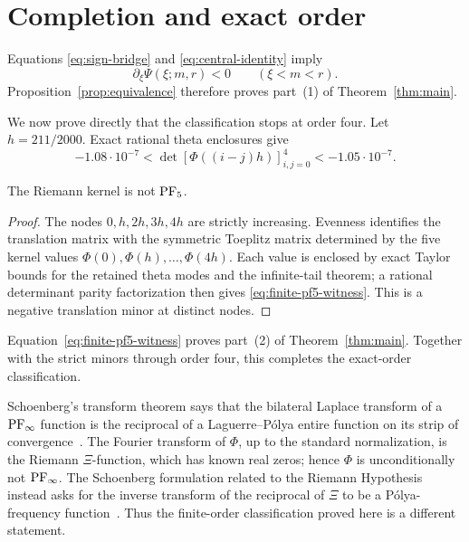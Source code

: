 \section{Completion and exact order}\label{sec:completion}

Equations \eqref{eq:sign-bridge} and \eqref{eq:central-identity} imply
\[
 \partial_\xi\Psi(\xi;m,r)<0\qquad(\xi<m<r).
\]
Proposition~\ref{prop:equivalence} therefore proves part~(1) of
Theorem~\ref{thm:main}.

We now prove directly that the classification stops at order four. Let
\(h=211/2000\). Exact rational theta enclosures give
\begin{equation}\label{eq:finite-pf5-witness}
 -1.08\mathbin{\cdot}10^{-7}
 <\det[\Phi((i-j)h)]_{i,j=0}^4
 <-1.05\mathbin{\cdot}10^{-7}.
\end{equation}

\begin{theorem}\label{thm:not-pf5}
The Riemann kernel is not \(\mathrm{PF}_5\).
\end{theorem}

\begin{proof}
The nodes \(0,h,2h,3h,4h\) are strictly increasing. Evenness identifies the
translation matrix with the symmetric Toeplitz matrix determined by the five
kernel values \(\Phi(0),\Phi(h),\ldots,\Phi(4h)\). Each value is enclosed by
exact Taylor bounds for the retained theta modes and the infinite-tail theorem;
a rational determinant parity factorization then gives
\eqref{eq:finite-pf5-witness}. This is a negative translation minor at
distinct nodes.
\end{proof}

Equation~\eqref{eq:finite-pf5-witness} proves part~(2) of
Theorem~\ref{thm:main}. Together with the strict minors through order four,
this completes the exact-order classification.

\begin{remark}
Schoenberg's transform theorem says that the bilateral Laplace transform of a
\(\mathrm{PF}_\infty\) function is the reciprocal of a Laguerre--P\'olya entire function
on its strip of convergence~\cite{schoenberg-ii,belton}. The Fourier transform
of \(\Phi\), up to the standard normalization, is the Riemann \(\Xi\)-function,
which has known real zeros; hence \(\Phi\) is unconditionally not
\(\mathrm{PF}_\infty\). The Schoenberg formulation related to the Riemann Hypothesis
instead asks for the inverse transform of the reciprocal of \(\Xi\) to be a
P\'olya-frequency function~\cite{grochenig}. Thus the finite-order
classification proved here is a different statement.
\end{remark}
